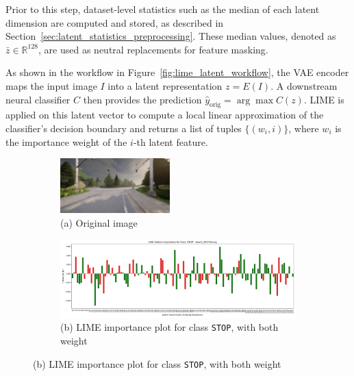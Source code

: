Prior to this step, dataset-level statistics such as the median of each latent dimension are computed and stored, as described in Section~\ref{sec:latent_statistics_preprocessing}. These median values, denoted as $\bar{z} \in \mathbb{R}^{128}$, are used as neutral replacements for feature masking.

As shown in the workflow in Figure~\ref{fig:lime_latent_workflow}, the VAE encoder maps the input image $I$ into a latent representation $z = E(I)$. A downstream neural classifier $C$ then provides the prediction $\hat{y}_{\text{orig}} = \arg\max C(z)$. LIME is applied on this latent vector to compute a local linear approximation of the classifier’s decision boundary and returns a list of tuples $\{(w_i, i)\}$, where $w_i$ is the importance weight of the $i$-th latent feature.

\begin{figure}[htbp]
\centering
    \begin{subfigure}{0.24\textwidth}
        \includegraphics[width=\linewidth]{img/masking/lime_on_latent/original.png}
        \caption*{(a) Original image}
        \end{subfigure}
    \hfill
    \begin{subfigure}{0.72\textwidth}
        \includegraphics[width=\linewidth]{img/masking/lime_on_latent/town7_002748.png_lime_feature_importance_class_STOP_sorted.png}
        \caption*{(b) LIME importance plot for class \texttt{STOP}, with both weight}

\end{subfigure}
\end{figure}
